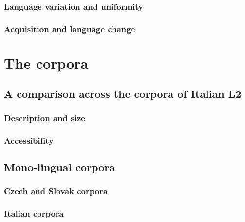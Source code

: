 \documentclass[
  a4paper,
  twoside,
  12pt,
  chapterprefix=false,
  bibliography=totocnumbered,
  listof=flat]{scrbook}
\begin{document}
\hypertarget{language-variation-and-uniformity}{%
\subsection{Language variation and uniformity}\label{language-variation-and-uniformity}}

\hypertarget{acquisition-and-language-change}{%
\subsection{Acquisition and language change}\label{acquisition-and-language-change}}

\hypertarget{the-corpora}{%
\chapter{The corpora}\label{the-corpora}}

\hypertarget{a-comparison-across-the-corpora-of-italian-l2}{%
\section{A comparison across the corpora of Italian L2}\label{a-comparison-across-the-corpora-of-italian-l2}}

\hypertarget{description-and-size}{%
\subsection{Description and size}\label{description-and-size}}

\hypertarget{accessibility}{%
\subsection{Accessibility}\label{accessibility}}

\hypertarget{mono-lingual-corpora}{%
\section{Mono-lingual corpora}\label{mono-lingual-corpora}}

\hypertarget{czech-and-slovak-corpora}{%
\subsection{Czech and Slovak corpora}\label{czech-and-slovak-corpora}}

\hypertarget{italian-corpora}{%
\subsection{Italian corpora}\label{italian-corpora}}
\end{document}
